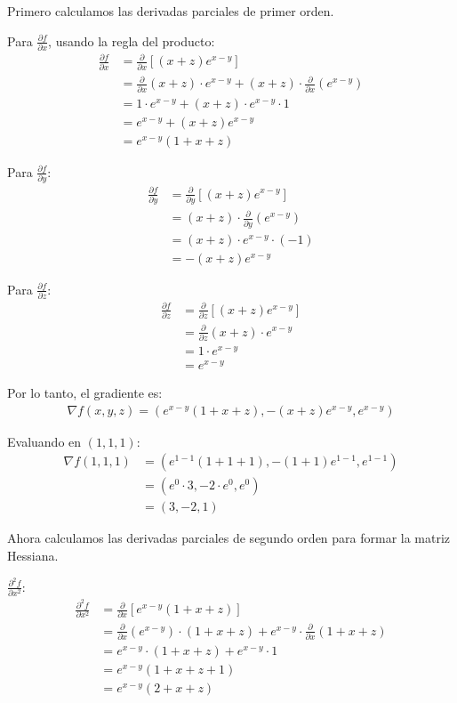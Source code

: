 \documentclass{article}
\begin{document}
Primero calculamos las derivadas parciales de primer orden.

Para $\frac{\partial f}{\partial x}$, usando la regla del producto:
\begin{align}
\frac{\partial f}{\partial x} &= \frac{\partial}{\partial x}[(x + z)e^{x-y}] \\
&= \frac{\partial}{\partial x}(x + z) \cdot e^{x-y} + (x + z) \cdot \frac{\partial}{\partial x}(e^{x-y}) \\
&= 1 \cdot e^{x-y} + (x + z) \cdot e^{x-y} \cdot 1 \\
&= e^{x-y} + (x + z)e^{x-y} \\
&= e^{x-y}(1 + x + z)
\end{align}

Para $\frac{\partial f}{\partial y}$:
\begin{align}
\frac{\partial f}{\partial y} &= \frac{\partial}{\partial y}[(x + z)e^{x-y}] \\
&= (x + z) \cdot \frac{\partial}{\partial y}(e^{x-y}) \\
&= (x + z) \cdot e^{x-y} \cdot (-1) \\
&= -(x + z)e^{x-y}
\end{align}

Para $\frac{\partial f}{\partial z}$:
\begin{align}
\frac{\partial f}{\partial z} &= \frac{\partial}{\partial z}[(x + z)e^{x-y}] \\
&= \frac{\partial}{\partial z}(x + z) \cdot e^{x-y} \\
&= 1 \cdot e^{x-y} \\
&= e^{x-y}
\end{align}

Por lo tanto, el gradiente es:
\begin{align}
\nabla f(x,y,z) = \left(e^{x-y}(1 + x + z), -(x + z)e^{x-y}, e^{x-y}\right)
\end{align}

Evaluando en $(1, 1, 1)$:
\begin{align}
\nabla f(1,1,1) &= \left(e^{1-1}(1 + 1 + 1), -(1 + 1)e^{1-1}, e^{1-1}\right) \\
&= \left(e^0 \cdot 3, -2 \cdot e^0, e^0\right) \\
&= (3, -2, 1)
\end{align}

Ahora calculamos las derivadas parciales de segundo orden para formar la matriz Hessiana.

$\frac{\partial^2 f}{\partial x^2}$:
\begin{align}
\frac{\partial^2 f}{\partial x^2} &= \frac{\partial}{\partial x}[e^{x-y}(1 + x + z)] \\
&= \frac{\partial}{\partial x}(e^{x-y}) \cdot (1 + x + z) + e^{x-y} \cdot \frac{\partial}{\partial x}(1 + x + z) \\
&= e^{x-y} \cdot (1 + x + z) + e^{x-y} \cdot 1 \\
&= e^{x-y}(1 + x + z + 1) \\
&= e^{x-y}(2 + x + z)
\end{align}
\end{document}
